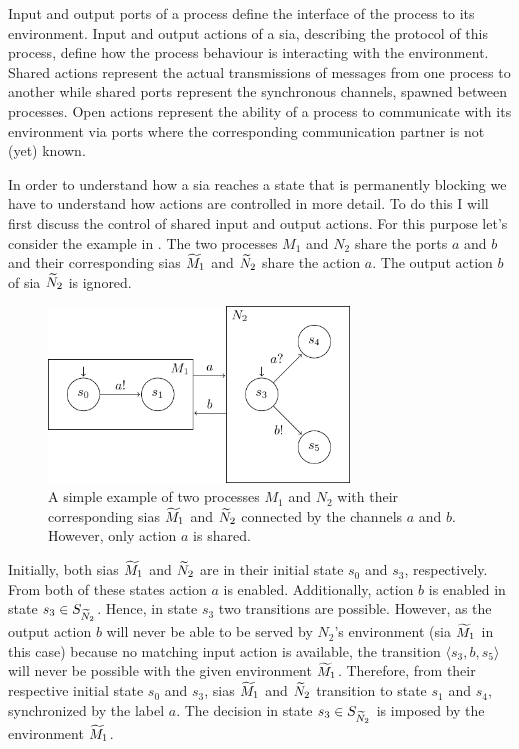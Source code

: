 Input and output ports of a process define the interface of the process to its environment.
Input and output actions of a \gls{sia}, describing the protocol of this process, define how the process behaviour is interacting with the environment.
Shared actions represent the actual transmissions of messages from one process to another while shared ports represent the synchronous channels, spawned between processes.
Open actions represent the ability of a process to communicate with its environment via ports where the corresponding communication partner is not (yet) known.

In order to understand how a \gls{sia} reaches a state that is permanently blocking we have to understand how actions are controlled in more detail.
To do this I will first discuss the control of shared input and output actions.
For this purpose let's consider the example in \Fig{\ref{fig_sia_control_shared}}.
The two processes $M_1$ and $N_2$ share the ports $a$ and $b$ and their corresponding \glspl{sia} $\widetilde{M}_1$ and $\widetilde{N}_2$ share the action $a$.
The output action $b$ of \gls{sia} $\widetilde{N}_2$ is ignored.
\begin{figure}[bht]
    \TopFigSpace
    \centering
    \includegraphics[width=8cm]{fig/sia_control_shared.pdf}
    \CaptionFigSpace
    \caption{A simple example of two processes $M_1$ and $N_2$ with their corresponding \glspl{sia} $\widetilde{M}_1$ and $\widetilde{N}_2$ connected by the channels $a$ and $b$.
    However, only action $a$ is shared.}
    \label{fig_sia_control_shared}
    \BotFigSpace
\end{figure}

Initially, both \glspl{sia} $\widetilde{M}_1$ and $\widetilde{N}_2$ are in their initial state $s_0$  and $s_3$, respectively.
From both of these states action $a$ is enabled.
Additionally, action $b$ is enabled in state $s_3 \in S_{\widetilde{N}_2}$.
Hence, in state $s_3$ two transitions are possible.
However, as the output action $b$ will never be able to be served by $N_2$'s environment (\gls{sia} $\widetilde{M}_1$ in this case) because no matching input action is available, the transition $\langle s_3, b, s_5 \rangle$ will never be possible with the given environment $\widetilde{M}_1$.
Therefore, from their respective initial state $s_0$ and $s_3$, \glspl{sia} $\widetilde{M}_1$ and $\widetilde{N}_2$ transition to state $s_1$ and $s_4$, synchronized by the label $a$.
The decision in state $s_3 \in S_{\widetilde{N}_2}$ is imposed by the environment $\widetilde{M}_1$.

